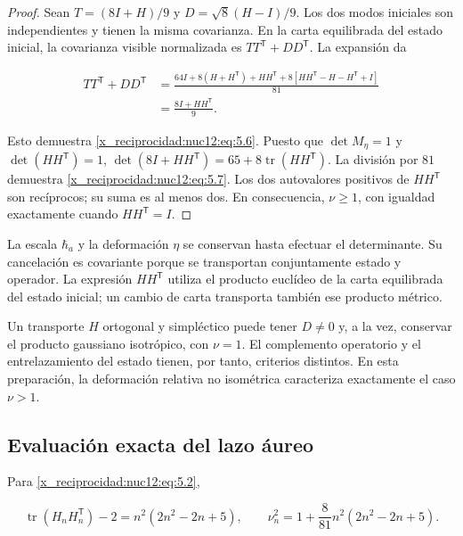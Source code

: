 \begin{proof}
Sean \(T=(8I+H)/9\) y \(D=\sqrt8(H-I)/9\). Los dos modos iniciales son independientes y tienen la misma covarianza. En la carta equilibrada del estado inicial, la covarianza visible normalizada es \(TT^{\mathsf T}+DD^{\mathsf T}\). La expansión da



\[
\begin{aligned}
TT^{\mathsf T}+DD^{\mathsf T}
&=\frac{64I+8(H+H^{\mathsf T})+HH^{\mathsf T}
+8[HH^{\mathsf T}-H-H^{\mathsf T}+I]}{81}\\
&=\frac{8I+HH^{\mathsf T}}9.
\end{aligned}
\]



Esto demuestra \eqref{x_reciprocidad:nuc12:eq:5.6}. Puesto que \(\det M_\eta=1\) y \(\det(HH^{\mathsf T})=1\),
\(\det(8I+HH^{\mathsf T})=65+8\operatorname{tr}(HH^{\mathsf T})\).
La división por \(81\) demuestra \eqref{x_reciprocidad:nuc12:eq:5.7}. Los dos autovalores positivos de \(HH^{\mathsf T}\) son recíprocos; su suma es al menos dos. En consecuencia, \(\nu\geq1\), con igualdad exactamente cuando \(HH^{\mathsf T}=I\).
\end{proof}

La escala \(\hbar_a\) y la deformación \(\eta\) se conservan hasta efectuar el determinante. Su cancelación es covariante porque se transportan conjuntamente estado y operador. La expresión \(HH^{\mathsf T}\) utiliza el producto euclídeo de la carta equilibrada del estado inicial; un cambio de carta transporta también ese producto métrico.

Un transporte \(H\) ortogonal y simpléctico puede tener \(D\neq0\) y, a la vez, conservar el producto gaussiano isotrópico, con \(\nu=1\). El complemento operatorio y el entrelazamiento del estado tienen, por tanto, criterios distintos. En esta preparación, la deformación relativa no isométrica caracteriza exactamente el caso \(\nu>1\).

\subsection{Evaluación exacta del lazo áureo}

Para \eqref{x_reciprocidad:nuc12:eq:5.2},



\begin{equation}
\operatorname{tr}(H_nH_n^{\mathsf T})-2
=n^2(2n^2-2n+5),\qquad
\nu_n^2=1+\frac8{81}n^2(2n^2-2n+5).
\label{x_reciprocidad:nuc12:eq:5.8}
\end{equation}



